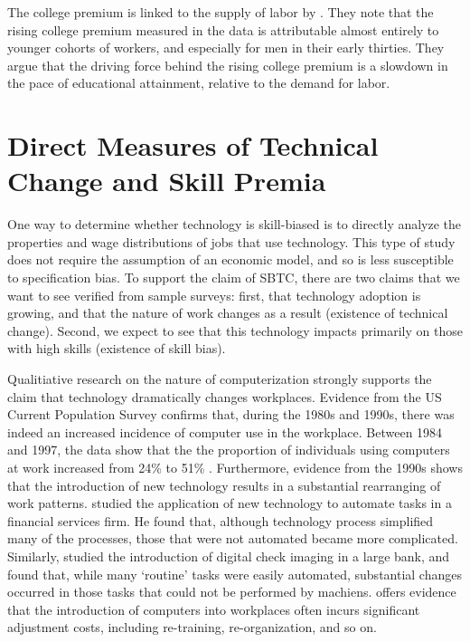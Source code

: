 The college premium is linked to the supply of labor by \cite{Card2001}. They note that the rising college premium measured in the data is attributable almost entirely to younger cohorts of workers, and especially for men in their early thirties. They argue that the driving force behind the rising college premium is a slowdown in the pace of educational attainment, relative to the demand for labor.

\cite{Borland1999}

\section{Direct Measures of Technical Change and Skill Premia}

One way to determine whether technology is skill-biased is to directly analyze the properties and wage distributions of jobs that use technology. This type of study does not require the assumption of an economic model, and so is less susceptible to specification bias. To support the claim of SBTC, there are two claims that we want to see verified from sample surveys: first, that technology adoption is growing, and that the nature of work changes as a result (existence of technical change). Second, we expect to see that this technology impacts primarily on those with high skills (existence of skill bias).

Qualitiative research on the nature of computerization strongly supports the claim that technology dramatically changes workplaces. Evidence from the US Current Population Survey confirms that, during the 1980s and 1990s, there was indeed an increased incidence of computer use in the workplace. Between 1984 and 1997, the data show that the the proportion of individuals using computers at work increased from 24\% to 51\% \cite{Friedberg2003}. Furthermore, evidence from the 1990s shows that the introduction of new technology results in a substantial rearranging of work patterns. \citet{Levy1996} studied the application of new technology to automate tasks in a financial services firm. He found that, although technology process simplified many of the processes, those that were not automated became more complicated. Similarly, \citet{Autor2002} studied the introduction of digital check imaging in a large bank, and found that, while many `routine' tasks were easily automated, substantial changes occurred in those tasks that could not be performed by machiens. \citet{Bresnahan2002} offers evidence that the introduction of computers into workplaces often incurs significant adjustment costs, including re-training, re-organization, and so on.

